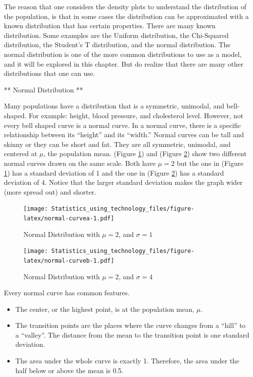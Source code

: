 \documentclass[
]{book}
\providecommand{\tightlist}{%
  \setlength{\itemsep}{0pt}\setlength{\parskip}{0pt}}
\begin{document}
The reason that one considers the density plots to understand the distribution of the population, is that in some cases the distribution can be approximated with a known distribution that has certain properties. There are many known distribution. Some examples are the Uniform distribution, the Chi-Squared distribution, the Student's T distribution, and the normal distribution. The normal distribution is one of the more common distributions to use as a model, and it will be explored in this chapter. But do realize that there are many other distributions that one can use.

** Normal Distribution **

Many populations have a distribution that is a symmetric, unimodal, and bell-shaped. For example: height, blood pressure, and cholesterol level. However, not every bell shaped curve is a normal curve. In a normal curve, there is a specific relationship between its ``height'' and its ``width.''
Normal curves can be tall and skinny or they can be short and fat. They are all symmetric, unimodal, and centered at \(\mu\), the population mean. (Figure \ref{fig:normal-curvea}) and (Figure \ref{fig:normal-curveb}) show two different normal curves drawn on the same scale. Both have \(\mu=2\) but the one in (Figure \ref{fig:normal-curvea}) has a standard deviation of 1 and the one in (Figure \ref{fig:normal-curveb}) has a standard deviation of 4. Notice that the larger standard deviation makes the graph wider (more spread out) and shorter.



\begin{figure}
\centering
\texttt{[image: Statistics\_using\_technology\_files/figure-latex/normal-curvea-1.pdf]}
\caption{\label{fig:normal-curvea}Normal Distribution with \(\mu=2\), and \(\sigma=1\)}
\end{figure}



\begin{figure}
\centering
\texttt{[image: Statistics\_using\_technology\_files/figure-latex/normal-curveb-1.pdf]}
\caption{\label{fig:normal-curveb}Normal Distribution with \(\mu = 2\), and \(\sigma = 4\)}
\end{figure}

Every normal curve has common features.

\begin{itemize}
\tightlist
\item
  The center, or the highest point, is at the population mean, \(\mu\).
\item
  The transition points are the places where the curve changes from a ``hill'' to a ``valley''. The distance from the mean to the transition point is one standard deviation.
\item
  The area under the whole curve is exactly 1. Therefore, the area under the half below or above the mean is 0.5.
\end{itemize}
\end{document}
